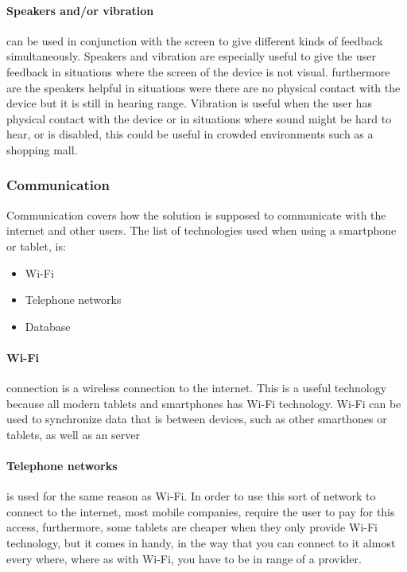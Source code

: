 \paragraph{Speakers and/or vibration} can be used in conjunction with the screen to give different kinds of feedback simultaneously.
Speakers and vibration are especially useful to give the user feedback in situations where the screen of the device is not visual. furthermore are the speakers helpful in situations were there are no physical contact with the device but it is still in hearing range. Vibration is useful when the user has physical contact with the device or in situations where sound might be hard to hear, or is disabled, this could be useful in crowded environments such as a shopping mall.     

\subsubsection{Communication}
Communication covers how the solution is supposed to communicate with the internet and other users. The list of technologies used when using a smartphone or tablet, is:
\begin{itemize}
	\item Wi-Fi
	\item Telephone networks
    \item Database
\end{itemize}

\paragraph{Wi-Fi} connection is a wireless connection to the internet.
This is a useful technology because all modern tablets and smartphones has Wi-Fi technology.
Wi-Fi can be used to synchronize data that is between devices, such as other smarthones or tablets, as well as an server

\paragraph{Telephone networks} is used for the same reason as Wi-Fi. In order to use this sort of network to connect to the internet, most mobile companies, require the user to pay for this access, furthermore, some tablets are cheaper when they only provide Wi-Fi technology, but it comes in handy, in the way that you can connect to it almost every where, where as with Wi-Fi, you have to be in range of a provider.

